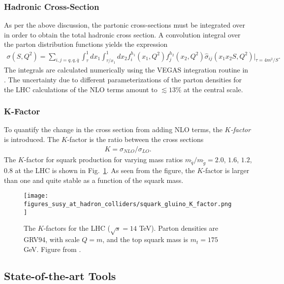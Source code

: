 \documentclass[twoside,english]{uiofysmaster}
\begin{document}
{\subsubsection{Hadronic Cross-Section}

As per the above discussion, the partonic cross-sections must be integrated over in order to obtain the total hadronic cross section. A convolution integral over the parton distribution functions yields the expression 
\begin{align}
\sigma(S, Q^2) = \sum_{i,j=q, q, \bar{q}} \int_{\tau}^1dx_1 \int_{\tau/x_1}^1 dx_2 f_i^{h_1} (x_1, Q^2) f_j^{h_2}(x_2, Q^2) \hat{\sigma}_{ij} (x_1x_2S, Q^2)\Big|_{\tau=4m^2/S}.
\end{align}
The integrals are calculated numerically using the VEGAS integration routine \cite{PETERLEPAGE1978192} in \cite{beenakker1997squark}.
The uncertainty due to different parameterizations of the parton densities for the LHC calculations of the NLO terms amount to $\lesssim 13 \%$ at the central scale.

\subsubsection{K-Factor}

To quantify the change in the cross section from adding NLO terms, the \textit{$K$-factor} is introduced. The $K$-factor is the ratio between the cross sections
\begin{align}
K = \sigma_{NLO}/\sigma_{LO}.
\end{align}
The $K$-factor for squark production for varying mass ratios $m_{\widetilde{q}}/m_{\widetilde{g}}=2.0$, $ 1.6$, $1.2$, $0.8$ at the LHC is shown in Fig.\ \ref{Fig:: susy hadron : K-factor LHC}. As seen from the figure, the $K$-factor is larger than one and quite stable as a function of the squark mass. 

\begin{figure}
\centering
\texttt{[image: figures\_susy\_at\_hadron\_colliders/squark\_gluino\_K\_factor.png]}
\caption{The $K$-factors for the LHC ($\sqrt{s}=14$ TeV). Parton densities are GRV94, with scale $Q=m$, and the top squark mass is $m_t=175$ GeV. Figure from \cite{beenakker1997squark}.}
\label{Fig:: susy hadron : K-factor LHC}
\end{figure}


\subsection{State-of-the-art Tools}

}
\end{document}

